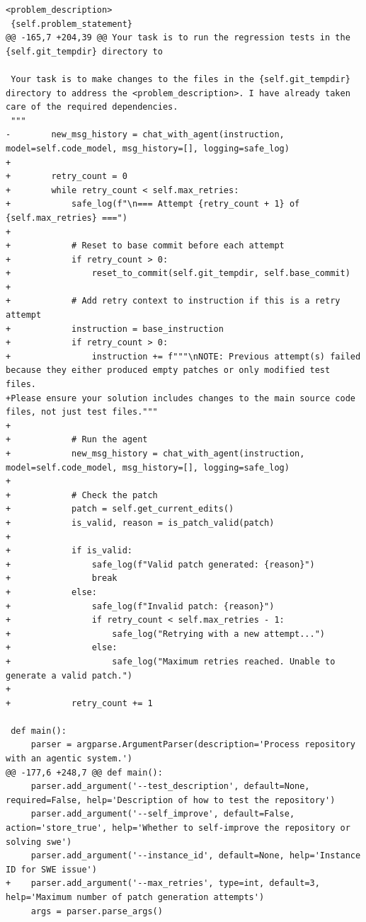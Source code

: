 \documentclass{article} %
\begin{document}
\begin{lstlisting}[style=diffstyle]
 <problem_description>
 {self.problem_statement}
@@ -165,7 +204,39 @@ Your task is to run the regression tests in the {self.git_tempdir} directory to
 
 Your task is to make changes to the files in the {self.git_tempdir} directory to address the <problem_description>. I have already taken care of the required dependencies.
 """
-        new_msg_history = chat_with_agent(instruction, model=self.code_model, msg_history=[], logging=safe_log)
+
+        retry_count = 0
+        while retry_count < self.max_retries:
+            safe_log(f"\n=== Attempt {retry_count + 1} of {self.max_retries} ===")
+            
+            # Reset to base commit before each attempt
+            if retry_count > 0:
+                reset_to_commit(self.git_tempdir, self.base_commit)
+            
+            # Add retry context to instruction if this is a retry attempt
+            instruction = base_instruction
+            if retry_count > 0:
+                instruction += f"""\nNOTE: Previous attempt(s) failed because they either produced empty patches or only modified test files. 
+Please ensure your solution includes changes to the main source code files, not just test files."""
+
+            # Run the agent
+            new_msg_history = chat_with_agent(instruction, model=self.code_model, msg_history=[], logging=safe_log)
+            
+            # Check the patch
+            patch = self.get_current_edits()
+            is_valid, reason = is_patch_valid(patch)
+            
+            if is_valid:
+                safe_log(f"Valid patch generated: {reason}")
+                break
+            else:
+                safe_log(f"Invalid patch: {reason}")
+                if retry_count < self.max_retries - 1:
+                    safe_log("Retrying with a new attempt...")
+                else:
+                    safe_log("Maximum retries reached. Unable to generate a valid patch.")
+            
+            retry_count += 1
 
 def main():
     parser = argparse.ArgumentParser(description='Process repository with an agentic system.')
@@ -177,6 +248,7 @@ def main():
     parser.add_argument('--test_description', default=None, required=False, help='Description of how to test the repository')
     parser.add_argument('--self_improve', default=False, action='store_true', help='Whether to self-improve the repository or solving swe')
     parser.add_argument('--instance_id', default=None, help='Instance ID for SWE issue')
+    parser.add_argument('--max_retries', type=int, default=3, help='Maximum number of patch generation attempts')
     args = parser.parse_args()
 

\end{lstlisting}
\end{document}
